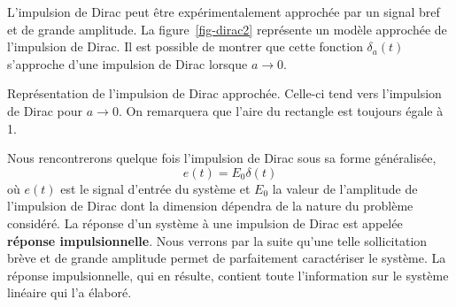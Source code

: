 \begin{figure}[!h]
    \centering
    
\end{figure}
L'impulsion de Dirac peut être expérimentalement approchée par un signal 
bref et de grande amplitude. La figure~\ref{fig-dirac2} représente un modèle 
approchée de l'impulsion de Dirac. Il est possible de montrer que cette fonction
$\delta_a(t)$ s'approche d'une impulsion de Dirac lorsque $a\to0$.
\begin{marginfigure}
    \centering
    
    \caption{Représentation de l'impulsion de Dirac approchée. 
             Celle-ci tend vers l'impulsion de Dirac pour $a\to0$. 
             On remarquera que l'aire du rectangle est toujours égale à 1.
             \label{fig-dirac2}}
\end{marginfigure}

Nous rencontrerons quelque fois l'impulsion de Dirac sous sa forme généralisée, 
\[
e(t)=E_0\delta(t)
\]
où $e(t)$ est le signal d'entrée du système et $E_0$ la valeur de l'amplitude 
de l'impulsion de Dirac dont la dimension dépendra de la nature du 
problème considéré.
La réponse d'un système à une impulsion de Dirac est appelée 
\textbf{réponse impulsionnelle}.
Nous verrons par la suite qu'une telle sollicitation brève et de grande 
amplitude permet de parfaitement caractériser le système. La réponse 
impulsionnelle, qui en résulte, contient toute l'information sur le système 
linéaire qui l'a élaboré.
